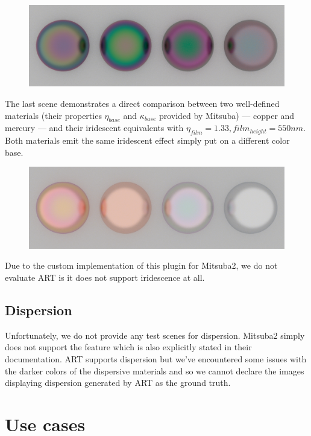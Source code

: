 \begin{description}
\begin{figure}[H]
		\centering
		\includegraphics[width=.9\linewidth]{img/iridescent_spheres_film.png}
		\caption{}
		\label{fig:irid_ior}
	\end{figure}
	\item[Materials~\ref{fig:irid_mat}] The last scene demonstrates a direct comparison between two well-defined materials (their properties $\eta_{base}$ and $\kappa_{base}$ provided by Mitsuba) --- copper and mercury --- and their iridescent equivalents with $\eta_{film}=1.33,film_{height}=550nm$. Both materials emit the same iridescent effect simply put on a  different color base.
	\begin{figure}[H]
		\centering
		\includegraphics[width=.9\linewidth]{img/iridescent_spheres_materials.png}
		\caption{}
		\label{fig:irid_mat}
	\end{figure}
\end{description}

Due to the custom implementation of this plugin for Mitsuba2, we do not evaluate ART is it does not support iridescence at all.

\subsection{Dispersion}

Unfortunately, we do not provide any test scenes for dispersion. Mitsuba2 simply does not support the feature which is also explicitly stated in their documentation. ART supports dispersion but we've encountered some issues with the darker colors of the dispersive materials and so we cannot declare the images displaying dispersion generated by ART as the ground truth.

\section{Use cases}

